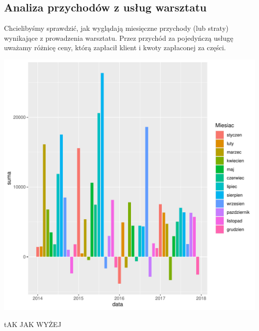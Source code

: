 \documentclass{article}\usepackage[]{graphicx}\usepackage[]{xcolor}
\makeatletter
\def\maxwidth{ %
  \ifdim\Gin@nat@width>\linewidth
    \linewidth
  \else
    \Gin@nat@width
  \fi
}
\newenvironment{knitrout}{}{} %
\makeatother
\begin{document}
\subsection{Analiza przychodów z usług warsztatu}

Chcielibyśmy sprawdzić, jak wyglądają miesięczne przychody (lub straty) wynikające z prowadzenia warsztatu. Przez przychód za pojedyńczą usługę uważamy różnicę ceny, którą zapłacił klient i kwoty zapłaconej za części.

\begin{knitrout}
\color{fgcolor}
\includegraphics[width=\maxwidth]{figure/unnamed-chunk-7-1} 
\end{knitrout}

{\color{red} tAK JAK WYŻEJ}
\end{document}
